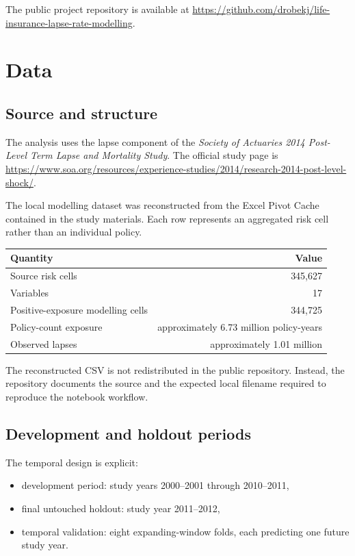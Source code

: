 \documentclass[11pt,a4paper]{article}
\theoremstyle{definition}
\begin{document}
The public project repository is available at \url{https://github.com/drobekj/life-insurance-lapse-rate-modelling}.

\section{Data}
\subsection{Source and structure}
The analysis uses the lapse component of the \textit{Society of Actuaries 2014 Post-Level Term Lapse and Mortality Study}. The official study page is \url{https://www.soa.org/resources/experience-studies/2014/research-2014-post-level-shock/}.

The local modelling dataset was reconstructed from the Excel Pivot Cache contained in the study materials. Each row represents an aggregated risk cell rather than an individual policy.

\begin{center}
\begin{tabular}{lr}
\toprule
Quantity & Value \\
\midrule
Source risk cells & 345,627 \\
Variables & 17 \\
Positive-exposure modelling cells & 344,725 \\
Policy-count exposure & approximately 6.73 million policy-years \\
Observed lapses & approximately 1.01 million \\
\bottomrule
\end{tabular}
\end{center}

The reconstructed CSV is not redistributed in the public repository. Instead, the repository documents the source and the expected local filename required to reproduce the notebook workflow.

\subsection{Development and holdout periods}
The temporal design is explicit:
\begin{itemize}
\item development period: study years 2000--2001 through 2010--2011,
\item final untouched holdout: study year 2011--2012,
\item temporal validation: eight expanding-window folds, each predicting one future study year.
\end{itemize}
\end{document}
